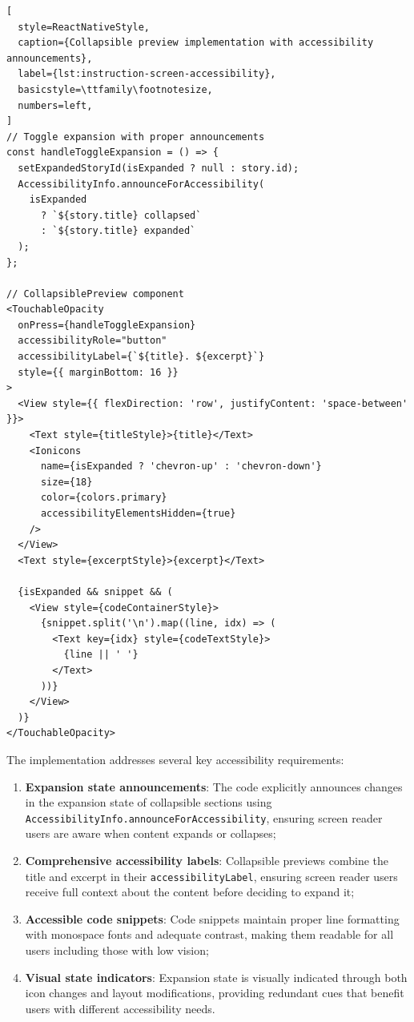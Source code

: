 \begin{lstlisting}[
  style=ReactNativeStyle,
  caption={Collapsible preview implementation with accessibility announcements},
  label={lst:instruction-screen-accessibility},
  basicstyle=\ttfamily\footnotesize,
  numbers=left,
]
// Toggle expansion with proper announcements
const handleToggleExpansion = () => {
  setExpandedStoryId(isExpanded ? null : story.id);
  AccessibilityInfo.announceForAccessibility(
    isExpanded 
      ? `${story.title} collapsed` 
      : `${story.title} expanded`
  );
};

// CollapsiblePreview component
<TouchableOpacity
  onPress={handleToggleExpansion}
  accessibilityRole="button"
  accessibilityLabel={`${title}. ${excerpt}`}
  style={{ marginBottom: 16 }}
>
  <View style={{ flexDirection: 'row', justifyContent: 'space-between' }}>
    <Text style={titleStyle}>{title}</Text>
    <Ionicons
      name={isExpanded ? 'chevron-up' : 'chevron-down'}
      size={18}
      color={colors.primary}
      accessibilityElementsHidden={true}
    />
  </View>
  <Text style={excerptStyle}>{excerpt}</Text>

  {isExpanded && snippet && (
    <View style={codeContainerStyle}>
      {snippet.split('\n').map((line, idx) => (
        <Text key={idx} style={codeTextStyle}>
          {line || ' '}
        </Text>
      ))}
    </View>
  )}
</TouchableOpacity>
\end{lstlisting}

\pagebreak

The implementation addresses several key accessibility requirements:

\begin{enumerate}
    \item \textbf{Expansion state announcements}: The code explicitly announces changes in the expansion state of collapsible sections using \texttt{AccessibilityInfo.announceForAccessibility}, ensuring screen reader users are aware when content expands or collapses;
    
    \item \textbf{Comprehensive accessibility labels}: Collapsible previews combine the title and excerpt in their \texttt{accessibilityLabel}, ensuring screen reader users receive full context about the content before deciding to expand it;
    
    \item \textbf{Accessible code snippets}: Code snippets maintain proper line formatting with monospace fonts and adequate contrast, making them readable for all users including those with low vision;
    
    \item \textbf{Visual state indicators}: Expansion state is visually indicated through both icon changes and layout modifications, providing redundant cues that benefit users with different accessibility needs.
\end{enumerate}

